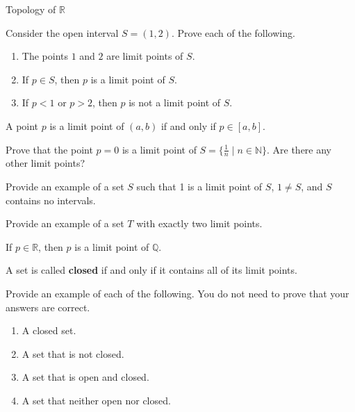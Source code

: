 \begin{section}{Topology of $\mathbb{R}$}
\begin{problem}
Consider the open interval $S=(1,2)$. Prove each of the following.
\begin{enumerate}[label=\textrm{(\alph*)}]
\item The points $1$ and $2$ are limit points of $S$.
\item If $p\in S$, then $p$ is a limit point of $S$.
\item If $p<1$ or $p>2$, then $p$ is not a limit point of $S$.
\end{enumerate}
\end{problem}

\begin{theorem}
A point $p$ is a limit point of $(a,b)$ if and only if $p\in [a,b]$.
\end{theorem}

\begin{problem}
Prove that the point $p=0$ is a limit point of $S=\{\frac{1}{n}\mid n \in \mathbb{N}\}$.  Are there any other limit points? 
\end{problem}

\begin{problem}
Provide an example of a set $S$ such that 1 is a limit point of $S$, $1\neq S$, and $S$ contains no intervals.
\end{problem}

\begin{problem}
Provide an example of a set $T$ with exactly two limit points.
\end{problem}

\begin{theorem}
If $p\in\mathbb{R}$, then $p$ is a limit point of $\mathbb{Q}$.
\end{theorem}

\begin{definition}
A set is called \textbf{closed} if and only if it contains all of its limit points.
\end{definition}

\begin{problem}
Provide an example of each of the following.  You do not need to prove that your answers are correct.
\begin{enumerate}[label=\textrm{(\alph*)}]
\item A closed set.
\item A set that is not closed.
\item A set that is open and closed.
\item A set that neither open nor closed.
\end{enumerate}


\end{problem}
\end{section}
